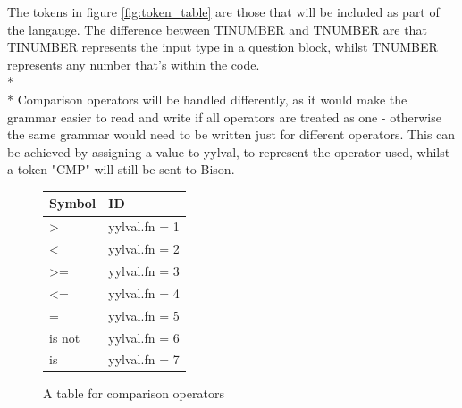 \documentclass[12pt]{report}
\begin{document}
The tokens in figure \ref{fig:token_table} are those that will be included as part of the langauge.  The difference between TINUMBER and TNUMBER are that TINUMBER represents the input type in a question block, whilst TNUMBER represents any number that's within the code.\\*
\\*
Comparison operators will be handled differently, as it would make the grammar easier to read and write if all operators are treated as one - otherwise the same grammar would need to be written just for different operators.  This can be achieved by assigning a value to yylval, to represent the operator used, whilst a token "CMP" will still be sent to Bison.\\
\begin{figure}[H]
	\begin{center}
		\begin{tabular}{ | l | l | }
		\hline
		\textbf{Symbol} & \textbf{ID} \\ \hline
		\textgreater & yylval.fn = 1 \\ \hline
		\textless & yylval.fn = 2 \\ \hline
		\textgreater = & yylval.fn = 3 \\ \hline
		\textless = & yylval.fn = 4 \\ \hline
		= & yylval.fn = 5 \\ \hline
		is not & yylval.fn = 6 \\ \hline
		is & yylval.fn = 7 \\ \hline
		\end{tabular}
		\caption{A table for comparison operators}\label{fig:cmp_table}
	\end{center}
\end{figure}
\end{document}
